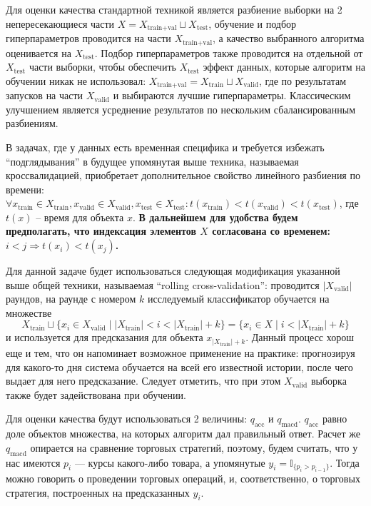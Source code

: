 \documentclass[pdftex,14pt,a4paper]{extreport}
\begin{document}
Для оценки качества стандартной техникой является разбиение выборки на 2 непересекающиеся части
$X = X_\text{train+val} \sqcup X_\text{test}$, обучение и подбор гиперпараметров проводится на части $X_\text{train+val}$,
а качество выбранного алгоритма оценивается на $X_\text{test}$.
Подбор гиперпараметров также проводится на отдельной от $X_\text{test}$ части выборки, чтобы обеспечить $X_\text{test}$ эффект
данных, которые алгоритм на обучении никак не использовал:
$X_\text{train+val} = X_\text{train} \sqcup X_\text{valid}$, где по результатам
запусков на части $X_\text{valid}$ и выбираются лучшие гиперпараметры. Классическим улучшением является усреднение результатов
по нескольким сбалансированным разбиениям.

В задачах, где у данных есть временная специфика и требуется избежать ``подглядывания'' в будущее упомянутая выше техника,
называемая кроссвалидацией, приобретает дополнительное свойство линейного разбиения по времени:
$\forall x_\text{train}\in X_\text{train}, x_\text{valid}\in X_\text{valid}, x_\text{test}\in X_\text{test}:
t(x_\text{train} ) < t(x_\text{valid} ) < t(x_\text{test} )$, где $t(x)$ -- время для объекта $x$.
\textbf{В дальнейшем для удобства будем предполагать, что индексация элементов $X$ согласована со временем:
$i<j\Rightarrow t(x_i)<t(x_j)$.}

Для данной задаче будет использоваться следующая модификация указанной выше общей техники, называемая ``rolling cross-validation'':
проводится $|X_\text{valid}|$ раундов, на раунде с номером $k$ исследуемый классификатор обучается на множестве
\[X_\text{train} \sqcup \{x_i \in X_\text{valid} \mid |X_\text{train}| < i < |X_\text{train}| + k\} =
\{x_i\in X \mid i < |X_\text{train}| + k\} \]
и используется для предсказания для объекта $x_{|X_\text{train}|+k}$. Данный процесс хорош еще и тем, что он напоминает возможное применение
на практике: прогнозируя для какого-то дня система обучается на всей его известной истории, после чего
выдает для него предсказание. Следует отметить, что при этом $X_\text{valid}$ выборка также будет задействована при обучении.

Для оценки качества будут использоваться 2 величины: $q_\text{acc}$ и $q_\text{macd}$. $q_\text{acc}$ равно доле объектов
множества, на которых алгоритм дал правильный ответ. Расчет же $q_\text{macd}$ опирается на сравнение торговых стратегий,
поэтому, будем считать, что у нас имеются $p_i$ --- курсы какого-либо товара, а упомянутые
$y_i=\mathbb{I}_{\{p_i > p_{i-1}\}}$.
Тогда можно говорить о проведении торговых операций, и, соответственно, о торговых стратегия, построенных на предсказанных $y_i$.
\end{document}
